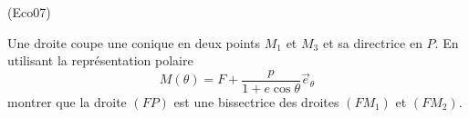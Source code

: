 \begin{tiny}(Eco07)\end{tiny} Une droite coupe une conique en deux points $M_1$ et $M_3$ et sa directrice en $P$. En utilisant la représentation polaire
\begin{displaymath}
 M(\theta) = F + \frac{p}{1+e\cos \theta}\overrightarrow{e}_\theta
\end{displaymath}
 montrer que la droite $(FP)$ est une bissectrice des droites $(FM_1)$ et $(FM_2)$.
